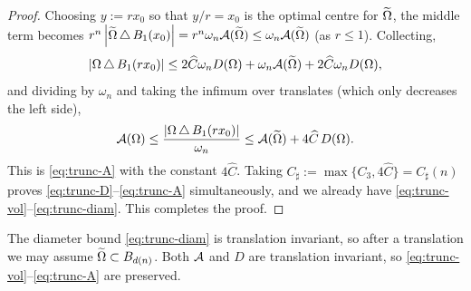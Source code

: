 \begin{proof}
Choosing $y:=r x_0$ so that $y/r=x_0$ is the
optimal centre for $\widetilde{\Omega}$, the middle term becomes
$r^n\left|\widetilde{\Omega}\,\triangle\,B_1(x_0)\right|=r^n\omega_n\mathcal A(\widetilde{\Omega})
\le\omega_n\mathcal A(\widetilde{\Omega})$ (as $r\le1$). Collecting,
\[
   \left|\Omega\,\triangle\,B_1(rx_0)\right|
   \le2\widehat C\omega_n D(\Omega)+\omega_n\mathcal A(\widetilde{\Omega})+2\widehat C\omega_n D(\Omega),
\]
and dividing by $\omega_n$ and taking the infimum over translates (which
only decreases the left side),
\begin{equation}\label{eq:trunc-A-pre}
   \mathcal A(\Omega)\le\frac{\left|\Omega\,\triangle\,B_1(rx_0)\right|}{\omega_n}
   \le\mathcal A(\widetilde{\Omega})+4\widehat C\,D(\Omega).
\end{equation}
This is \eqref{eq:trunc-A} with the constant $4\widehat C$.
Taking $C_\sharp:=\max\{C_3,4\widehat C\}=C_\sharp(n)$ proves
\eqref{eq:trunc-D}--\eqref{eq:trunc-A} simultaneously, and we already have
\eqref{eq:trunc-vol}--\eqref{eq:trunc-diam}. This completes the proof.
\end{proof}

\begin{remark}\label{rem:translate}
The diameter bound \eqref{eq:trunc-diam} is translation invariant, so
after a translation we may assume $\widetilde{\Omega}\subset B_{d(n)}$. Both
$\mathcal A$ and $D$ are translation invariant, so
\eqref{eq:trunc-vol}--\eqref{eq:trunc-A} are preserved.
\end{remark}

